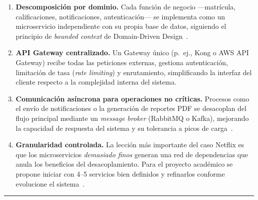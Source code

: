 \documentclass[11pt,a4paper]{article}
\begin{document}
\begin{enumerate}[leftmargin=*, itemsep=3pt, label=\textbf{\arabic{enumi}.}]

  \item \textbf{Descomposici\'on por dominio.} Cada funci\'on de negocio ---matr\'icula,
  calificaciones, notificaciones, autenticaci\'on--- se implementa como un microservicio
  independiente con su propia base de datos, siguiendo el principio de
  \textit{bounded context} de Domain-Driven Design~\cite{dragoni2017}.

  \item \textbf{API Gateway centralizado.} Un Gateway \'unico (p.~ej., Kong o AWS API
  Gateway) recibe todas las peticiones externas, gestiona autenticaci\'on, limitaci\'on de
  tasa (\textit{rate limiting}) y enrutamiento, simplificando la interfaz del cliente
  respecto a la complejidad interna del sistema.

  \item \textbf{Comunicaci\'on as\'incrona para operaciones no cr\'iticas.} Procesos como
  el env\'io de notificaciones o la generaci\'on de reportes PDF se desacoplan del flujo
  principal mediante un \textit{message broker} (RabbitMQ o Kafka), mejorando la
  capacidad de respuesta del sistema y su tolerancia a picos de carga~\cite{balalaie2016}.

  \item \textbf{Granularidad controlada.} La lecci\'on m\'as importante del caso Netflix es
  que los microservicios \textit{demasiado finos} generan una red de dependencias que
  anula los beneficios del desacoplamiento. Para el proyecto acad\'emico se propone
  iniciar con 4--5 servicios bien definidos y refinarlos conforme evolucione el
  sistema~\cite{blinowski2022}.

\end{enumerate}

\vspace{6pt}
{\color{uteqblue}\rule{\linewidth}{0.6pt}}
\end{document}
